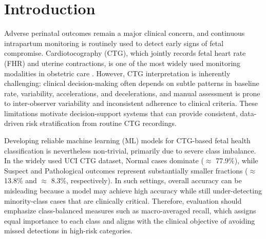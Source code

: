 \documentclass[sigconf]{acmart}
\begin{document}


\maketitle

\section{Introduction}
\label{sec:introduction}

Adverse perinatal outcomes remain a major clinical concern, and continuous intrapartum monitoring is routinely used to detect early signs of fetal compromise. Cardiotocography (CTG), which jointly records fetal heart rate (FHR) and uterine contractions, is one of the most widely used monitoring modalities in obstetric care \cite{ayres2015}. However, CTG interpretation is inherently challenging: clinical decision-making often depends on subtle patterns in baseline rate, variability, accelerations, and decelerations, and manual assessment is prone to inter-observer variability and inconsistent adherence to clinical criteria. These limitations motivate decision-support systems that can provide consistent, data-driven risk stratification from routine CTG recordings.

Developing reliable machine learning (ML) models for CTG-based fetal health classification is nevertheless non-trivial, primarily due to severe class imbalance. In the widely used UCI CTG dataset, Normal cases dominate ($\approx$ 77.9\%), while Suspect and Pathological outcomes represent substantially smaller fractions ($\approx$ 13.8\% and $\approx$ 8.3\%, respectively). In such settings, overall accuracy can be misleading because a model may achieve high accuracy while still under-detecting minority-class cases that are clinically critical. Therefore, evaluation should emphasize class-balanced measures such as macro-averaged recall, which assigns equal importance to each class and aligns with the clinical objective of avoiding missed detections in high-risk categories.
\end{document}
